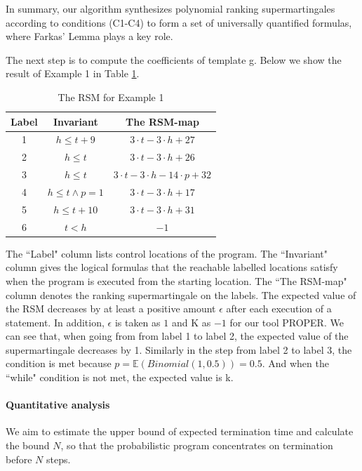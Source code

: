 \documentclass[runningheads]{llncs}
\begin{document}
In summary, our algorithm synthesizes polynomial ranking supermartingales according to conditions (C1-C4) to form a set of universally quantified formulas, where Farkas' Lemma plays a key  role.

The next step is to compute  the coefficients of template g. Below we show the result of Example 1 in Table \ref{RSM}. 

\begin{table}[htb]
	\centering
	\caption{The RSM for Example 1}
	\label{RSM}
	\begin{tabular}{|c|c|c|}
		\hline
		Label& Invariant & The RSM-map  \\ \hline
		1 & $h\leq t+9$ &$3\cdot t-3\cdot h+27$ \\ \hline
		2 & $h\leq t$ &$3\cdot t-3\cdot h+26$ \\ \hline
		3 & $h\leq t$  &$3\cdot t-3\cdot h-14\cdot p+32$ \\ \hline
		4 & $h\leq t\land p=1$ &$3\cdot t-3\cdot h+17$ \\ \hline
		5 & $h\leq t+10$&$3\cdot t-3\cdot h+31$ \\ \hline
		6 & $t<h$ &$-1$ \\ \hline
	\end{tabular}
\end{table}

The ``Label" column lists control locations of the program. The ``Invariant" column gives the logical formulas that the reachable labelled locations satisfy when the program is executed from the starting location. The ``The RSM-map" column denotes the ranking supermartingale on the labels. The expected value of the RSM decreases by at least a positive amount $\epsilon$ after each execution of a statement. In addition, $\epsilon$ is taken as $1$ and K as $-1$ for our tool PROPER. We can see that, 
when going from from label 1 to label 2, the expected value of the supermartingale decreases by 1. Similarly  in the step from label 2 to label 3,  the condition is met because $p=\mathbb{E}(Binomial(1,0.5))=0.5$. And when the ``while" condition is not met, the expected value is k.

\paragraph{Quantitative analysis} We aim to estimate the upper bound of expected termination time and calculate the bound $N$, so that the probabilistic program concentrates on termination before $N$ steps. 
\end{document}
